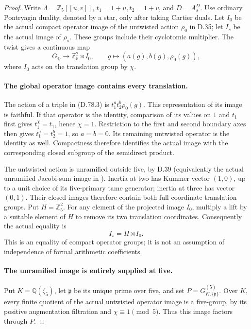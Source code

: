 \begin{proof}
Write \(\Lambda=\mathbb Z_5[[u,v]]\), \(t_1=1+u,t_2=1+v\),
and \(D=A_s^D\). Use ordinary Pontryagin duality, denoted by a
star, only after taking Cartier duals.
Let \(I_0\) be the actual compact operator image of the untwisted
action \(\rho_0\) in D.35; let \(I_s\) be the actual image of
\(\rho_s\). These groups include their cyclotomic multiplier.
The twist gives a continuous map
\[
 G_{\mathbb Q}\longrightarrow\mathbb Z_5^2\rtimes I_0,
       \qquad g\longmapsto(a(g),b(g),\rho_0(g)),
                                                               \tag{D.78.3}
\]
where \(I_0\) acts on the translation group by \(\chi\).

\paragraph{The global operator image contains every translation.}
The action of a triple in (D.78.3) is
\(t_1^a t_2^b\rho_0(g)\). This representation of its image is
faithful. If that operator is the identity, comparison of its
values on \(1\) and \(t_1\) first gives \(t_1^\chi=t_1\), hence
\(\chi=1\). Restriction to the first and second boundary axes
then gives \(t_1^a=t_2^b=1\), so \(a=b=0\). Its remaining
untwisted operator is the identity as well. Compactness therefore
identifies the actual image with the corresponding closed
subgroup of the semidirect product.

The untwisted action is unramified outside five, by D.39
(equivalently the actual unramified Jacobi-sum image in
\cite[(1.1)--(1.2) and the following paragraph]{DE_NakamuraSakugawaWojtkowiak2017}).
Inertia at two has Kummer vector \((1,0)\), up to a unit
choice of its five-primary tame generator; inertia at three
has vector \((0,1)\). Their closed images therefore contain
both full coordinate translation groups. Put \(H=\mathbb Z_5^2\).
For any element of the projected image \(I_0\), multiply a lift
by a suitable element of \(H\) to remove its two translation
coordinates. Consequently the actual equality is
\[
                         I_s=H\rtimes I_0.              \tag{D.78.4}
\]
This is an equality of compact operator groups; it is not an
assumption of independence of formal arithmetic coefficients.

\paragraph{The unramified image is entirely supplied at five.}
Put \(K=\mathbb Q(\zeta_5)\), let \(\mathfrak p\) be its unique
prime over five, and set \(P=G_{K,\{\mathfrak p\}}^{(5)}\).
Over \(K\), every finite quotient of the actual untwisted
operator image is a five-group, by its positive augmentation
filtration and \(\chi\equiv1\pmod5\). Thus this image factors
through \(P\).


\end{proof}
